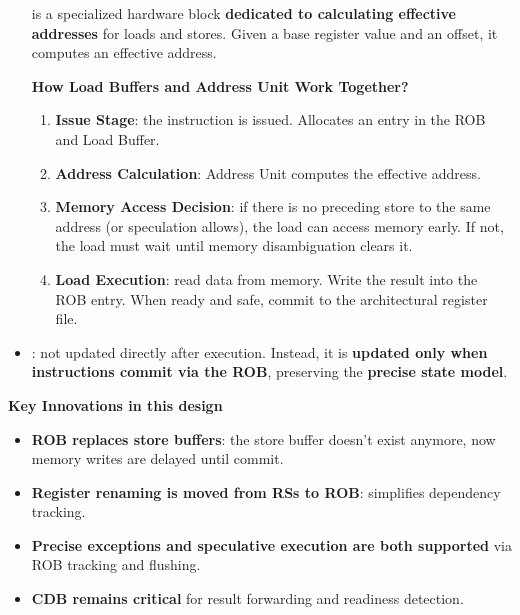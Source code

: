 \begin{itemize}
     is a specialized hardware block \textbf{dedicated to calculating effective addresses} for loads and stores. Given a base register value and an offset, it computes an effective address.

    \textcolor{Green3}{ \textbf{How Load Buffers and Address Unit Work Together?}}
    \begin{enumerate}
        \item \textbf{Issue Stage}: the instruction is issued. Allocates an entry in the ROB and Load Buffer.
        \item \textbf{Address Calculation}: Address Unit computes the effective address.
        \item \textbf{Memory Access Decision}: if there is no preceding store to the same address (or speculation allows), the load can access memory early. If not, the load must wait until memory disambiguation clears it.
        \item \textbf{Load Execution}: read data from memory. Write the result into the ROB entry. When ready and safe, commit to the architectural register file.
    \end{enumerate}

    \item {}: not updated directly after execution. Instead, it is \textbf{updated only when instructions commit via the ROB}, preserving the \textbf{precise state model}.
\end{itemize}

\highspace
\begin{flushleft}
    \textcolor{Green3}{ \textbf{Key Innovations in this design}}
\end{flushleft}
\begin{itemize}
    \item \textbf{ROB replaces store buffers}: the store buffer doesn't exist anymore, now memory writes are delayed until commit.
    \item \textbf{Register renaming is moved from RSs to ROB}: simplifies dependency tracking.
    \item \textbf{Precise exceptions and speculative execution are both supported} via ROB tracking and flushing.
    \item \textbf{CDB remains critical} for result forwarding and readiness detection.
\end{itemize}

